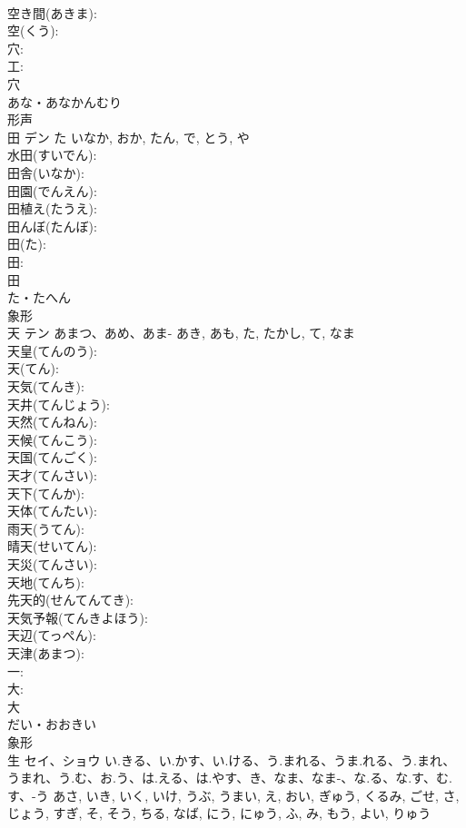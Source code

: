 \documentclass[8pt]{extreport}
\begin{document}
\begin{CJK}{UTF8}{min}
\\	空き間(あきま): 
\\	空(くう): 
\\	穴: 
\\	工: 
\\	穴	
\\	あな・あなかんむり	
\\	形声 
\\	田	デン	た	いなか, おか, たん, で, とう, や	
\\	水田(すいでん): 
\\	田舎(いなか): 
\\	田園(でんえん): 
\\	田植え(たうえ): 
\\	田んぼ(たんぼ): 
\\	田(た): 
\\	田: 
\\	田	
\\	た・たへん	
\\	象形 
\\	天	テン	あまつ、あめ、あま-	あき, あも, た, たかし, て, なま	
\\	天皇(てんのう): 
\\	天(てん): 
\\	天気(てんき): 
\\	天井(てんじょう): 
\\	天然(てんねん): 
\\	天候(てんこう): 
\\	天国(てんごく): 
\\	天才(てんさい): 
\\	天下(てんか): 
\\	天体(てんたい): 
\\	雨天(うてん): 
\\	晴天(せいてん): 
\\	天災(てんさい): 
\\	天地(てんち): 
\\	先天的(せんてんてき): 
\\	天気予報(てんきよほう): 
\\	天辺(てっぺん): 
\\	天津(あまつ): 
\\	一: 
\\	大: 
\\	大	
\\	だい・おおきい	
\\	象形 
\\	生	セイ、ショウ	い.きる、い.かす、い.ける、う.まれる、うま.れる、う.まれ、うまれ、う.む、お.う、は.える、は.やす、き、なま、なま-、な.る、な.す、む.す、-う	あさ, いき, いく, いけ, うぶ, うまい, え, おい, ぎゅう, くるみ, ごせ, さ, じょう, すぎ, そ, そう, ちる, なば, にう, にゅう, ふ, み, もう, よい, りゅう	

\end{CJK}
\end{document}

